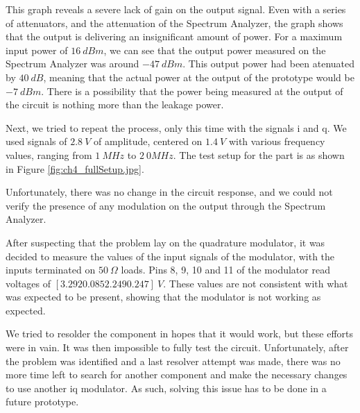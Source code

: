 \par This graph reveals a severe lack of gain on the output signal. Even with a series of attenuators, and the attenuation of the Spectrum Analyzer, the graph shows that the output is delivering an insignificant amount of power. For a maximum input power of $16\:\si{dBm}$, we can see that the output power measured on the Spectrum Analyzer was around $-47\:\si{dBm}$. This output power had been atenuated by $40 \:\si{dB}$, meaning that the actual power at the output of the prototype would be $-7\:\si{dBm}$. There is a possibility that the power being measured at the output of the circuit is nothing more than the leakage power.

\par Next, we tried to repeat the process, only this time with the signals \ac{i} and \ac{q}. We used signals of $2.8\:\si{V}$ of amplitude, centered on $1.4\:\si{V}$ with various frequency values, ranging from $1\:\si{MHz}$ to $2\:\si{0MHz}$. The test setup for the part is as shown in Figure \ref{fig:ch4_fullSetup.jpg}.

\par Unfortunately, there was no change in the circuit response, and we could not verify the presence of any modulation on the output through the Spectrum Analyzer.

\par After suspecting that the problem lay on the quadrature modulator, it was decided to measure the values of the input signals of the modulator, with the inputs terminated on $50\:\si{\Omega}$ loads. Pins 8, 9, 10 and 11 of the modulator read voltages of $[3.292 0.085 2.249 0.247]\:\si{V}$. These values are not consistent with what was expected to be present, showing that the modulator is not working as expected. 

\par We tried to resolder the component in hopes that it would work, but these efforts were in vain. It was then impossible to fully test the circuit. Unfortunately, after the problem was identified and a last resolver attempt was made, there was no more time left to search for another component and make the necessary changes to use another \ac{iq} modulator. As such, solving this issue has to be done in a future prototype.